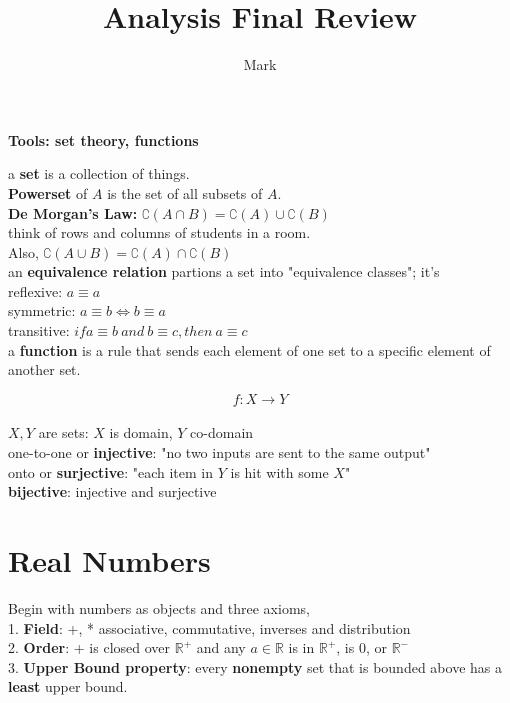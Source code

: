 \documentclass[12pt]{article}
\title{Analysis Final Review}
\author{Mark}
\date{}
\begin{document}
\maketitle
\centerline{\Large \textbf{Tools: set theory, functions}}
\medskip

a \textbf{set} is a collection of things. \\

\textbf{Powerset} of $A$ is the set of all subsets of $A$.\\

\textbf{De Morgan's Law: }$\complement (A \cap B) = \complement(A) \cup \complement(B)$\\
\indent \textcolor[gray]{0.5}{think of rows and columns of students in a room.}\\
\indent Also, 
$\complement(A \cup B) = \complement(A) \cap \complement(B)$\\

\noindent an \textbf{equivalence relation} partions a set into "equivalence classes"; it's \\
    \indent reflexive: $a \equiv a$ \\ 
    \indent symmetric: $a \equiv b \iff b \equiv a$ \\
    \indent transitive: $if a \equiv b \ and \ b \equiv c, then\ a \equiv c$ \\


\noindent a \textbf{function} is a rule that sends each element of one set to a specific element of another set. 

$$f: X \rightarrow Y$$ \\
$X, Y$ are sets: $X$ is domain, $Y$ co-domain\\

\noindent one-to-one or \textbf{injective}: "no two inputs are sent to the same output"\\
onto or \textbf{surjective}: "each item in $Y$ is hit with some $X$"\\
\textbf{bijective}: injective and surjective

\section*{Real Numbers}

Begin with numbers as objects and three axioms, \\
1. \textbf{Field}: \textcolor[gray]{0.5}{+, * associative, commutative, inverses and distribution}\\
2. \textbf{Order}: + is closed over $\mathbb{R}^+$ and any $a \in \mathbb{R}$ is in $\mathbb{R}^+$, is 0, or $\mathbb{R}^-$\\
3. \textbf{Upper Bound property}: every \textbf{nonempty} set that is bounded above has a \textbf{least} upper bound.  \\ 
\end{document}
